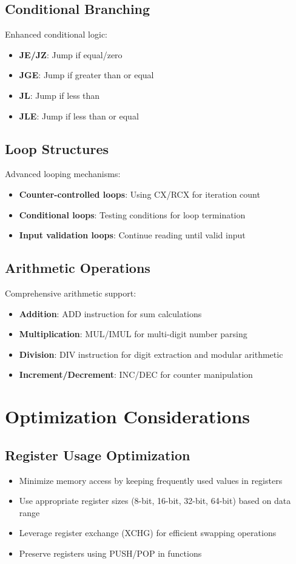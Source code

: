 \documentclass[12pt,a4paper]{article}
\begin{document}
\subsection{Conditional Branching}
Enhanced conditional logic:
\begin{itemize}
\item \textbf{JE/JZ}: Jump if equal/zero
\item \textbf{JGE}: Jump if greater than or equal
\item \textbf{JL}: Jump if less than
\item \textbf{JLE}: Jump if less than or equal
\end{itemize}

\subsection{Loop Structures}
Advanced looping mechanisms:
\begin{itemize}
\item \textbf{Counter-controlled loops}: Using CX/RCX for iteration count
\item \textbf{Conditional loops}: Testing conditions for loop termination
\item \textbf{Input validation loops}: Continue reading until valid input
\end{itemize}

\subsection{Arithmetic Operations}
Comprehensive arithmetic support:
\begin{itemize}
\item \textbf{Addition}: ADD instruction for sum calculations
\item \textbf{Multiplication}: MUL/IMUL for multi-digit number parsing
\item \textbf{Division}: DIV instruction for digit extraction and modular arithmetic
\item \textbf{Increment/Decrement}: INC/DEC for counter manipulation
\end{itemize}

\section{Optimization Considerations}

\subsection{Register Usage Optimization}
\begin{itemize}
\item Minimize memory access by keeping frequently used values in registers
\item Use appropriate register sizes (8-bit, 16-bit, 32-bit, 64-bit) based on data range
\item Leverage register exchange (XCHG) for efficient swapping operations
\item Preserve registers using PUSH/POP in functions
\end{itemize}
\end{document}
